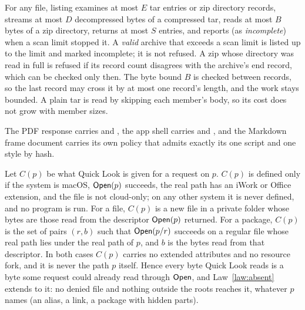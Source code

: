 \begin{law}
\label{law:archive-bounded}
For any file, listing examines at most $E$ tar entries or zip directory records,
streams at most $D$ decompressed bytes of a compressed tar, reads at most $B$
bytes of a zip directory, returns at most $S$ entries, and reports (as
\emph{incomplete}) when a scan limit stopped it.  A \emph{valid} archive that
exceeds a scan limit is listed up to the limit and marked incomplete; it is not
refused.  A zip whose directory was read in full is refused if its record count
disagrees with the archive's end record, which can be checked only then.  The
byte bound $B$ is checked between records, so the last record may cross it by at
most one record's length, and the work stays bounded.  A plain tar is read by
skipping each member's body, so its cost does not grow with member sizes.
\end{law}

\begin{law}
\label{law:pdf-frame}
The PDF response carries  and
, the app shell carries  and
, and the Markdown frame document carries its own
policy that admits exactly its one script and one style by hash.
\end{law}

\begin{law}
\label{law:quicklook}
Let $C(p)$ be what Quick Look is given for a request on $p$.  $C(p)$ is defined
only if the system is macOS, $\mathsf{Open}(p)$ succeeds, the real path has an iWork or
Office extension, and the file is not cloud-only; on any other system it is never
defined, and no program is run.  For a file, $C(p)$ is a new file in a private folder
whose bytes are those read from the descriptor $\mathsf{Open}(p)$ returned.  For a
package, $C(p)$ is the set of pairs $(r, b)$ such that $\mathsf{Open}(p/r)$ succeeds on a
regular file whose real path lies under the real path of $p$, and $b$ is the bytes
read from that descriptor.  In both cases $C(p)$ carries no extended attributes and
no resource fork, and it is never the path $p$ itself.  Hence every byte Quick Look
reads is a byte some request could already read through $\mathsf{Open}$, and
Law~\ref{law:absent} extends to it: no denied file and nothing outside the roots
reaches it, whatever $p$ names (an alias, a link, a package with hidden parts).
\end{law}

